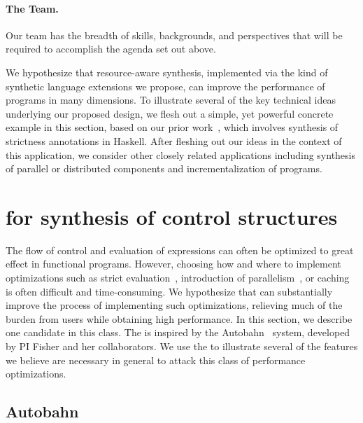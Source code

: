 \paragraph{The Team.}  Our team has the breadth of skills, backgrounds, and perspectives that will be required to accomplish the agenda set out above.  


We hypothesize that resource-aware synthesis, implemented via the kind
of synthetic language extensions we propose, can improve the
performance of programs in many dimensions.  To illustrate several of
the key technical ideas underlying our proposed design, we flesh out a
simple, yet powerful concrete example in this section, based on our
prior work~\cite{autobahn}, which involves synthesis of strictness
annotations in Haskell.  After fleshing out our ideas in the context
of this application, we consider other closely related applications
including synthesis of parallel or distributed components and
incrementalization of programs.

\section{\rasps for synthesis of control structures}

The flow of control and evaluation of expressions can often be
optimized to great effect in functional programs.  However, choosing
how and where to implement optimizations such as strict
evaluation~\cite{autobahn}, introduction of
parallelism~\cite{implicit-parallelism}, or caching is often difficult
and time-consuming.  We hypothesize that \rasps can substantially
improve the process of implementing such optimizations, relieving much
of the burden from \rasp users while obtaining high performance.  In
this section, we describe one candidate \rasp in this class.
The \rasp is inspired by the
Autobahn~\cite{autobahn} system, developed by PI Fisher and her
collaborators.  We use the \rasp to illustrate several of the features
we believe are necessary in general to attack this class of performance
optimizations.

\subsection{Autobahn}

